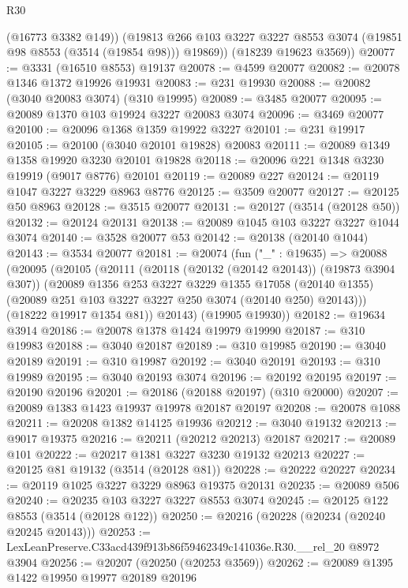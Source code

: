 \begin{lexlean}{R30}
\begin{coremodule}
          (@16773 @3382 @149))
        (@19813 @266 @103 @3227 @3227 @8553 @3074 (@19851 @98 @8553 (@3514 (@19854 @98))) @19869))
      (@18239 @19623 @3569))
@20077 := @3331 (@16510 @8553) @19137
@20078 := @4599 @20077
@20082 := @20078 @1346 @1372 @19926 @19931
@20083 := @231 @19930
@20088 := @20082 (@3040 @20083 @3074) (@310 @19995)
@20089 := @3485 @20077
@20095 := @20089 @1370 @103 @19924 @3227 @20083 @3074
@20096 := @3469 @20077
@20100 := @20096 @1368 @1359 @19922 @3227
@20101 := @231 @19917
@20105 := @20100 (@3040 @20101 @19828) @20083
@20111 := @20089 @1349 @1358 @19920 @3230 @20101 @19828
@20118 := @20096 @221 @1348 @3230 @19919 (@9017 @8776) @20101
@20119 := @20089 @227
@20124 := @20119 @1047 @3227 @3229 @8963 @8776
@20125 := @3509 @20077
@20127 := @20125 @50 @8963
@20128 := @3515 @20077
@20131 := @20127 (@3514 (@20128 @50))
@20132 := @20124 @20131
@20138 := @20089 @1045 @103 @3227 @3227 @1044 @3074
@20140 := @3528 @20077 @53
@20142 := @20138 (@20140 @1044)
@20143 := @3534 @20077
@20181 := @20074
    (fun ("_" : @19635) =>
    @20088
      (@20095
        (@20105
          (@20111
            (@20118 (@20132 (@20142 @20143)) (@19873 @3904 @307))
            (@20089
              @1356
              @253
              @3227
              @3229
              @1355
              @17058
              (@20140 @1355)
              (@20089 @251 @103 @3227 @3227 @250 @3074 (@20140 @250) @20143)))
          (@18222 @19917 @1354 @81))
        @20143)
      (@19905 @19930))
@20182 := @19634 @3914
@20186 := @20078 @1378 @1424 @19979 @19990
@20187 := @310 @19983
@20188 := @3040 @20187
@20189 := @310 @19985
@20190 := @3040 @20189
@20191 := @310 @19987
@20192 := @3040 @20191
@20193 := @310 @19989
@20195 := @3040 @20193 @3074
@20196 := @20192 @20195
@20197 := @20190 @20196
@20201 := @20186 (@20188 @20197) (@310 @20000)
@20207 := @20089 @1383 @1423 @19937 @19978 @20187 @20197
@20208 := @20078 @1088
@20211 := @20208 @1382 @14125 @19936
@20212 := @3040 @19132
@20213 := @9017 @19375
@20216 := @20211 (@20212 @20213) @20187
@20217 := @20089 @101
@20222 := @20217 @1381 @3227 @3230 @19132 @20213
@20227 := @20125 @81 @19132 (@3514 (@20128 @81))
@20228 := @20222 @20227
@20234 := @20119 @1025 @3227 @3229 @8963 @19375 @20131
@20235 := @20089 @506
@20240 := @20235 @103 @3227 @3227 @8553 @3074
@20245 := @20125 @122 @8553 (@3514 (@20128 @122))
@20250 := @20216 (@20228 (@20234 (@20240 @20245 @20143)))
@20253 := LexLeanPreserve.C33acd439f913b86f59462349c141036e.R30.__rel_20 @8972 @3904
@20256 := @20207 (@20250 (@20253 @3569))
@20262 := @20089 @1395 @1422 @19950 @19977 @20189 @20196

\end{coremodule}
\end{lexlean}
